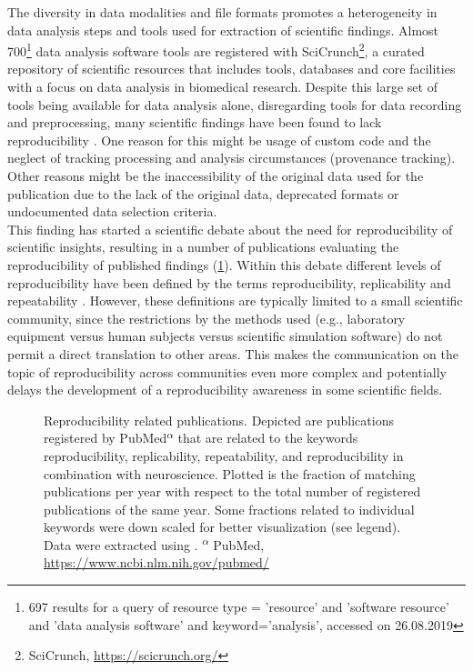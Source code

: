 The diversity in data modalities and file formats promotes a heterogeneity in data analysis steps and tools used for extraction of scientific findings. Almost 700\footnote{697 results for a query of resource type = 'resource' and 'software resource' and 'data analysis software' and keyword='analysis', accessed on 26.08.2019} data analysis software tools are registered with SciCrunch\footnote{SciCrunch, \url{https://scicrunch.org/}}, a curated repository of scientific resources that includes tools, databases and core facilities with a focus on data analysis in biomedical research. Despite this large set of tools being available for data analysis alone, disregarding tools for data recording and preprocessing, many scientific findings have been found to lack reproducibility \citep{Ioannidis_2005,Ioannidis_2007,Baker_2016,Eisner_2018}. One reason for this might be usage of custom code and the neglect of tracking processing and analysis circumstances (provenance tracking). Other reasons might be the inaccessibility of the original data used for the publication due to the lack of the original data, deprecated formats or undocumented data selection criteria.\\

This finding has started a scientific debate about the need for reproducibility of scientific insights, resulting in a number of publications evaluating the reproducibility of published findings (\cref{fig:intro_reproducibility}). Within this debate different levels of reproducibility have been defined by the terms reproducibility, replicability and repeatability \citep{Plesser_2018}. However, these definitions are typically limited to a small scientific community, since the restrictions by the methods used (e.g., laboratory equipment versus human subjects versus scientific simulation software) do not permit a direct translation to other areas. This makes the communication on the topic of reproducibility across communities even more complex and potentially delays the development of a reproducibility awareness in some scientific fields.\\


\begin{figure}[h!]
 \centering
 
 \caption[Reproducibility related publications]{Reproducibility related publications. Depicted  are publications registered by PubMed\textsuperscript{$\alpha$} that are related to the keywords reproducibility, replicability, repeatability, and reproducibility in combination with neuroscience. Plotted is the fraction of matching publications per year with respect to the total number of registered publications of the same year. Some fractions related to individual keywords were down scaled for better visualization (see legend). Data were extracted using \citet{Corlan_2004}. \small\textsuperscript{$\alpha$} PubMed, \url{https://www.ncbi.nlm.nih.gov/pubmed/}}
 \label{fig:intro_reproducibility}
\end{figure}

